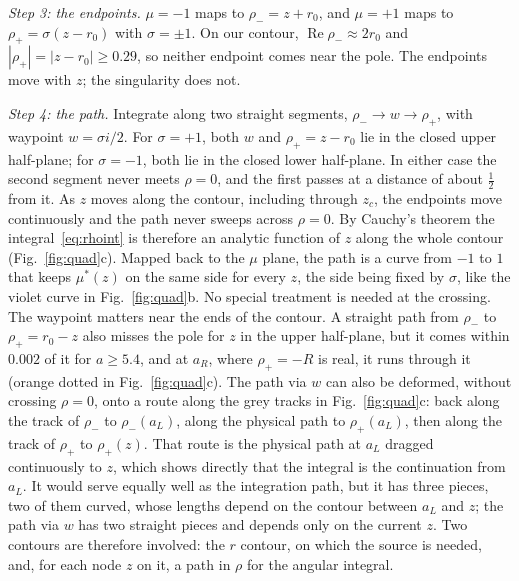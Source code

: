 \documentclass[aps,prl,twocolumn,superscriptaddress,nofootinbib,floatfix]{revtex4-2}
\renewcommand{\Re}{\operatorname{Re}}
\begin{document}
\emph{Step 3: the endpoints.}
$\mu=-1$ maps to $\rho_-=z+r_0$, and $\mu=+1$ maps to $\rho_+=\sigma(z-r_0)$ with $\sigma=\pm1$.
On our contour, $\Re\rho_-\approx2r_0$ and $|\rho_+|=|z-r_0|\ge0.29$, so neither endpoint comes near the pole.
The endpoints move with $z$; the singularity does not.

\emph{Step 4: the path.}
Integrate along two straight segments, $\rho_-\to w\to\rho_+$, with waypoint $w=\sigma i/2$.
For $\sigma=+1$, both $w$ and $\rho_+=z-r_0$ lie in the closed upper half-plane; for $\sigma=-1$, both lie in the closed lower half-plane.
In either case the second segment never meets $\rho=0$, and the first passes at a distance of about $\tfrac12$ from it.
As $z$ moves along the contour, including through $z_c$, the endpoints move continuously and the path never sweeps across $\rho=0$.
By Cauchy's theorem the integral~\eqref{eq:rhoint} is therefore an analytic function of $z$ along the whole contour (Fig.~\ref{fig:quad}c).
Mapped back to the $\mu$ plane, the path is a curve from $-1$ to $1$ that keeps $\mu^*(z)$ on the same side for every $z$, the side being fixed by $\sigma$, like the violet curve in Fig.~\ref{fig:quad}b.
No special treatment is needed at the crossing.
The waypoint matters near the ends of the contour.
A straight path from $\rho_-$ to $\rho_+=r_0-z$ also misses the pole for $z$ in the upper half-plane, but it comes within $0.002$ of it for $a\ge5.4$, and at $a_R$, where $\rho_+=-R$ is real, it runs through it (orange dotted in Fig.~\ref{fig:quad}c).
The path via $w$ can also be deformed, without crossing $\rho=0$, onto a route along the grey tracks in Fig.~\ref{fig:quad}c: back along the track of $\rho_-$ to $\rho_-(a_L)$, along the physical path to $\rho_+(a_L)$, then along the track of $\rho_+$ to $\rho_+(z)$.
That route is the physical path at $a_L$ dragged continuously to $z$, which shows directly that the integral is the continuation from $a_L$.
It would serve equally well as the integration path, but it has three pieces, two of them curved, whose lengths depend on the contour between $a_L$ and $z$; the path via $w$ has two straight pieces and depends only on the current $z$.
Two contours are therefore involved: the $r$ contour, on which the source is needed, and, for each node $z$ on it, a path in $\rho$ for the angular integral.
\end{document}
